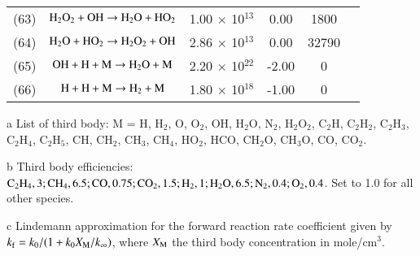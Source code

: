 \documentclass{warpdoc}
\begin{document}
\begin{table}[h]
\begin{center}
\begin{threeparttable}
\begin{tabular}{cccccc}
(63) & $\rm H_2 O_2 + OH \rightarrow H_2 O + H O_2 $ &1.00 $\times$ 10$^{13}$  &0.00 &1800&\cite{rkm:1991:smoke}\\

(64) & $\rm H_2 O + H O_2  \rightarrow H_2 O_2 + OH $ &2.86 $\times$ 10$^{13}$  &0.00 &32790&\cite{rkm:1991:smoke}\\

(65) & $\rm OH + H+ M  \rightarrow H_2 O +M $ &2.20 $\times$ 10$^{22}$  &-2.00 &0&\cite{rkm:1991:smoke}\\

(66) & $\rm H + H+ M  \rightarrow H_2  +M $ &1.80 $\times$ 10$^{18}$  &-1.00 &0&\cite{rkm:1991:smoke}\\

\bottomrule
\end{tabular}
\label{tab:park}
\begin{tablenotes}
\item[{a}] List of third body: M = H, H$_2$, O, O$_2$, OH, H$_2$O, N$_2$, H$_2$O$_2$,
   C$_2$H, C$_2$H$_2$, C$_2$H$_3$, C$_2$H$_4$, C$_2$H$_5$, CH, CH$_2$, 
   CH$_3$, CH$_4$, HO$_2$, HCO, CH$_2$O, CH$_3$O, CO, CO$_2$.
\item[{b}] Third body efficiencies: $\rm C_2 H_4, 3; CH_4, 6.5; CO, 0.75; C O_2, 1.5; H_2, 1; H_2 O, 6.5; N_2, 0.4; O_2, 0.4$. Set to 1.0 for all other species.
\item[{c}] Lindemann approximation for the forward
reaction rate coefficient given by $k_{\rm f} = k_0 / (1+k_0 X_{\rm M} / k_\infty)$, where $X_{\rm M}$ the third body concentration in mole/cm$^3$.

\end{tablenotes}
\end{threeparttable}
\end{center}
\end{table} 
%
\clearpage


\end{document}
